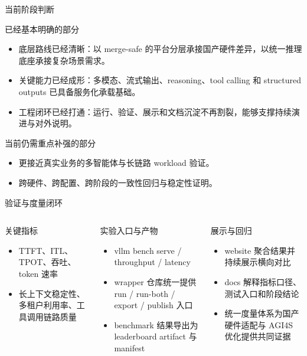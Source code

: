 \documentclass[aspectratio=169,11pt,fontset=none]{ctexbeamer}
\begin{document}
\begin{frame}{当前阶段判断}
  \small
  \begin{block}{已经基本明确的部分}
    \begin{itemize}
      \item 底层路线已经清晰：以 merge-safe 的平台分层承接国产硬件差异，以统一推理底座承接复杂场景需求。
      \item 关键能力已经成形：多模态、流式输出、reasoning、tool calling 和 structured outputs 已具备服务化承载基础。
      \item 工程闭环已经打通：运行、验证、展示和文档沉淀不再割裂，能够支撑持续演进与对外说明。
    \end{itemize}
  \end{block}

  \begin{alertblock}{当前仍需重点补强的部分}
    \begin{itemize}
      \item 更接近真实业务的多智能体与长链路 workload 验证。
      \item 跨硬件、跨配置、跨阶段的一致性回归与稳定性证明。
    \end{itemize}
  \end{alertblock}
\end{frame}

\begin{frame}{验证与度量闭环}
  \small
  \begin{columns}[T]
    \begin{block}{关键指标}
      \begin{itemize}
        \item TTFT、ITL、TPOT、吞吐、token 速率
        \item 长上下文稳定性、多租户利用率、工具调用链路质量
      \end{itemize}
    \end{block}

    \begin{block}{实验入口与产物}
      \begin{itemize}
        \item vllm bench serve / throughput / latency
        \item wrapper 仓库统一提供 run / run-both / export / publish 入口
        \item benchmark 结果导出为 leaderboard artifact 与 manifest
      \end{itemize}
    \end{block}

    \begin{block}{展示与回归}
      \begin{itemize}
        \item website 聚合结果并持续展示横向对比
        \item docs 解释指标口径、测试入口和阶段结论
        \item 统一度量体系为国产硬件适配与 AGI4S 优化提供共同证据
      \end{itemize}
    \end{block}
  \end{columns}
\end{frame}
\end{document}
